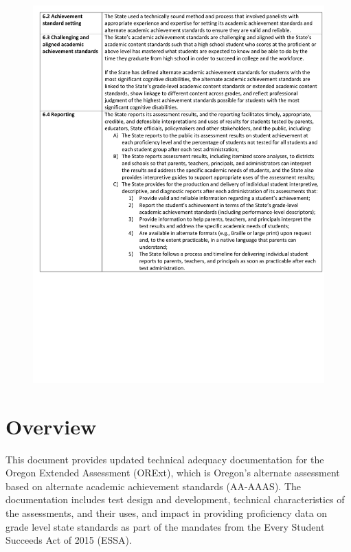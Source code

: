 \documentclass[]{article}
\begin{document}
\begin{figure}
\centering
\includegraphics{Figures/peer_rev/PeerReview6.pdf}
\caption{}
\end{figure}

\section{Overview}\label{overview}

This document provides updated technical adequacy documentation for the
Oregon Extended Assessment (ORExt), which is Oregon's alternate
assessment based on alternate academic achievement standards (AA-AAAS).
The documentation includes test design and development, technical
characteristics of the assessments, and their uses, and impact in
providing proficiency data on grade level state standards as part of the
mandates from the Every Student Succeeds Act of 2015 (ESSA).
\end{document}
